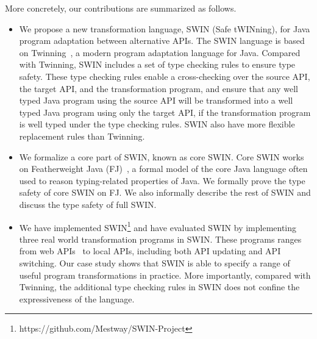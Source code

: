 More concretely, our contributions are summarized as follows.
\begin{itemize}
\item We propose a new transformation language, SWIN (Safe tWINning),
  for Java program adaptation between alternative APIs. The SWIN
  language is based on Twinning~\cite{twinning}, a modern program
  adaptation language for Java. Compared with Twinning, SWIN includes
  a set of type checking rules to ensure type safety. These
  type checking rules enable a cross-checking over the source API, the
  target API, and the transformation program, and ensure that any well
  typed Java program using the source API will be transformed into a
  well typed Java program using only the target API, if the
  transformation program is well typed under the type checking rules.
  SWIN also have more flexible replacement rules than Twinning.
\item We formalize a core part of SWIN, known as core SWIN. Core SWIN
  works on Featherweight Java (FJ)~\cite{fj}, a formal model of the core Java
  language often used to reason typing-related properties of Java. We
  formally prove the type safety of core SWIN on FJ. We also
  informally describe
  the rest of SWIN and discuss the type safety of full SWIN.
\item We have implemented
  SWIN\footnote{https://github.com/Mestway/SWIN-Project} and have
  evaluated SWIN by implementing three real world transformation
  programs in SWIN. These programs ranges from web APIs~\cite{webapi}
  to local APIs, including both API updating and API switching. Our
  case study shows that SWIN is able to specify a range of useful
  program transformations in practice. More importantly, compared with
  Twinning, the additional type checking rules in SWIN does not confine the
  expressiveness of the language.
\end{itemize}


